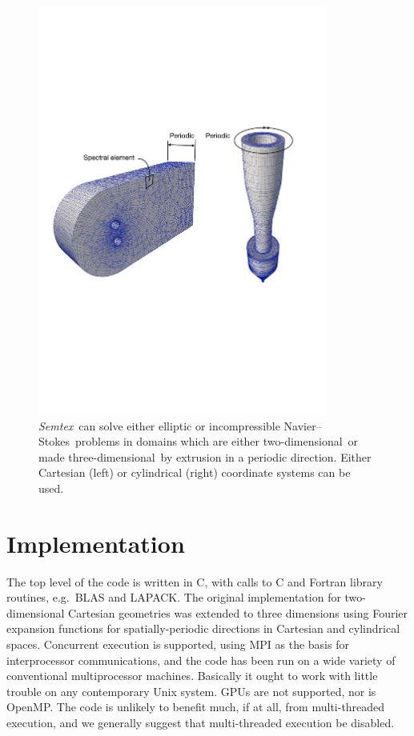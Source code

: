 \documentclass[11pt]{report}
\newcommand{\Semtex}{\emph{Semtex}} \newcommand{\Dog}{\emph{Dog}}
\newcommand\twod{two-di\-men\-sion\-al}
\newcommand\threed{three-di\-men\-sion\-al}
\newcommand{\eg}{e.g.\ } \newcommand{\CC}{\mathrm{c.c.}}
\newcommand\NavSto{Navier--Stokes}
\newcommand\cpp{C\nolinebreak\hspace{-.05em}\raisebox{.3ex}{\footnotesize\bf
+}\nolinebreak\hspace{-.10em}\raisebox{.3ex}{\footnotesize\bf+}}
\begin{document}
\begin{figure}
  \begin{center}
    \includegraphics[width=0.85\textwidth]{2+5DSemMesh}
  \end{center}
  \caption{ \Semtex\ can solve either elliptic or incompressible
    \NavSto\ problems in domains which are either \twod\ or made
    \threed\ by extrusion in a periodic direction.  Either Cartesian
    (left) or cylindrical (right) coordinate systems can be used.
  }
  \label{fig.extrude}
\end{figure}


\section{Implementation}

The top level of the code is written in \cpp, with calls to C and
Fortran library routines, \eg BLAS and LAPACK. The original
implementation for two-dimensional Cartesian geometries was extended
to three dimensions using Fourier expansion functions for
spatially-periodic directions in Cartesian and cylindrical spaces.
Concurrent execution is supported, using MPI as the basis for
interprocessor communications, and the code has been run on a wide
variety of conventional multiprocessor machines.  Basically it ought
to work with little trouble on any contemporary Unix system.  GPUs are
not supported, nor is OpenMP.  The code is unlikely to benefit much,
if at all, from multi-threaded execution, and we generally suggest
that multi-threaded execution be disabled.
\end{document}
